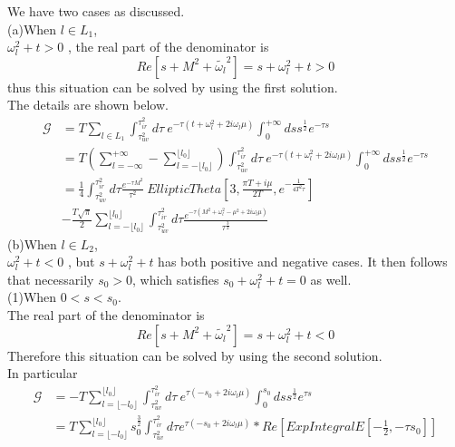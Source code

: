 \documentclass{article}
\begin{document}
We have two cases as discussed.\\
(a)\quad When $l\in L_1$,\\
$\omega_l^2+t>0$ , the real part of the denominator is
\begin{equation}
    Re\left[s+M^2+\widetilde{\omega_l}^2\right]=s+\omega_l^2+t>0 
\end{equation}
thus this situation can be solved by using the first solution.
\\The details are shown below.
\begin{equation}
    \begin{split}
        \mathcal{G} &=T \sum_{l\in L_1}^{ } \int_{\tau_{uv}^2}^{\tau_{ir}^2}d\tau\ e^{-\tau \left(t+\omega_l^2+2i\omega_l\mu\right)}  \int_{0}^{+\infty}ds  s^{\frac{1}{2}}e^{-\tau s}\\
        &=T\left(\sum_{l=-\infty}^{+\infty}-\sum_{l=-\lfloor l_0\rfloor}^{\lfloor l_0\rfloor}\right)\int_{\tau_{uv}^2}^{\tau_{ir}^2}d\tau\ e^{-\tau \left(t+\omega_l^2+2i\omega_l\mu\right)}  \int_{0}^{+\infty}ds  s^{\frac{1}{2}}e^{-\tau s}\\
        &=\frac{1}{4}\int_{\tau_{uv}^2}^{\tau_{ir}^2}d\tau \frac{e^{-\tau M^2}}{\tau^2}\  EllipticTheta[3,\frac{\pi T+i\mu}{2T},e^{-\frac{1}{4T^2\tau}}]\\
        &-\frac{T\sqrt{\pi}}{2}\sum_{l=-\lfloor l_0\rfloor}^{\lfloor l_0\rfloor}\int_{\tau_{uv}^2}^{\tau_{ir}^2}d\tau \frac{e^{-\tau \left(M^2+\omega_l^2-\mu^2+2i\omega_l\mu\right)}}{\tau^{\frac{3}{2}}} 
    \end{split}
\end{equation}
(b)\quad When $l\in L_2$, \\
$\omega_l^2+t<0$ , but $s+\omega_l^2+t$ has both positive and negative cases.
It then follows that necessarily $s_0>0$, which satisfies $s_0+\omega_l^2+t=0$ as well.\\
(1)\quad When $0<s<s_0$. \\
The real part of the denominator is
\begin{equation}
Re\left[s+M^2+\widetilde{\omega_l}^2\right]=s+\omega_l^2+t<0 
\end{equation}
Therefore this situation can be solved by using the second solution.
\\In particular
\begin{equation}\label{first}
    \begin{split}
        \mathcal{G} &=-T \sum_{l=\lfloor -l_0\rfloor}^{\lfloor l_0\rfloor} \int_{\tau_{uv}^2}^{\tau_{ir}^2}d\tau\ e^{\tau \left(-s_0+2i\omega_l\mu\right)}  \int_{0}^{s_0}ds  s^{\frac{1}{2}}e^{\tau s}\\
        &=T\sum_{l=\lfloor -l_0\rfloor}^{\lfloor l_0\rfloor}s_0^{\frac{3}{2}}
        \int_{\tau_{uv}^2}^{\tau_{ir}^2}d\tau e^{\tau\left(-s_0+2i\omega_l\mu \right)}*Re\left[ExpIntegralE\left[-\frac{1}{2},-\tau s_0\right]\right] 
    \end{split}
\end{equation}
\end{document}
